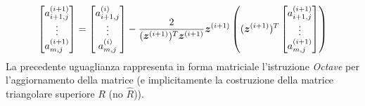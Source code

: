 \begin{oss}
\begin{displaymath}
\begin{bmatrix}
a_{i+1, j}^{(i+1)} \\
\vdots \\
a_{m, j}^{(i+1)}
\end{bmatrix} = 
\begin{bmatrix}
a_{i+1, j}^{(i)} \\
\vdots \\
a_{m, j}^{(i)}
\end{bmatrix} - \frac{2}{(\vect{z}^{(i+1)})^{T} \vect{z}^{(i+1)}} %
\vect{z}^{(i+1)} %
\left ( (\vect{z}^{(i+1)})^{T} \begin{bmatrix}
a_{i+1, j}^{(i+1)} \\
\vdots \\
a_{m, j}^{(i+1)} 
\end{bmatrix} \right )
\end{displaymath}
La precedente uguaglianza rappresenta in forma matriciale l'istruzione
\emph{Octave} per l'aggiornamento della matrice (e implicitamente la
costruzione della matrice triangolare superiore $R$ (no $\hat{R}$)).
\end{oss}

